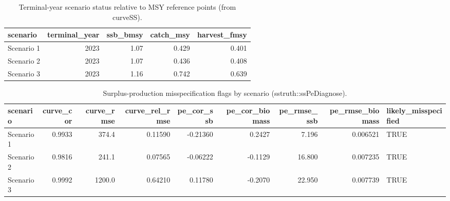 
\begin{table}

\caption{\label{tab:robustness-pe-summary}Terminal-year scenario status relative to MSY reference points (from curveSS).}
\centering
\begin{tabular}[t]{lrrrr}
\toprule
scenario & terminal\_year & ssb\_bmsy & catch\_msy & harvest\_fmsy\\
\midrule
Scenario 1 & 2023 & 1.07 & 0.429 & 0.401\\
Scenario 2 & 2023 & 1.07 & 0.436 & 0.408\\
Scenario 3 & 2023 & 1.16 & 0.742 & 0.639\\
\bottomrule
\end{tabular}
\end{table}

\begin{table}

\caption{\label{tab:robustness-sspe}Surplus-production misspecification flags by scenario (sstruth::ssPeDiagnose).}
\centering
\begin{tabular}[t]{lrrrrrrrl}
\toprule
scenario & curve\_cor & curve\_rmse & curve\_rel\_rmse & pe\_cor\_ssb & pe\_cor\_biomass & pe\_rmse\_ssb & pe\_rmse\_biomass & likely\_misspecified\\
\midrule
Scenario 1 & 0.9933 & 374.4 & 0.11590 & -0.21360 & 0.2427 & 7.196 & 0.006521 & TRUE\\
Scenario 2 & 0.9816 & 241.1 & 0.07565 & -0.06222 & -0.1129 & 16.800 & 0.007235 & TRUE\\
Scenario 3 & 0.9992 & 1200.0 & 0.64210 & 0.11780 & -0.2070 & 22.950 & 0.007739 & TRUE\\
\bottomrule
\end{tabular}
\end{table}

